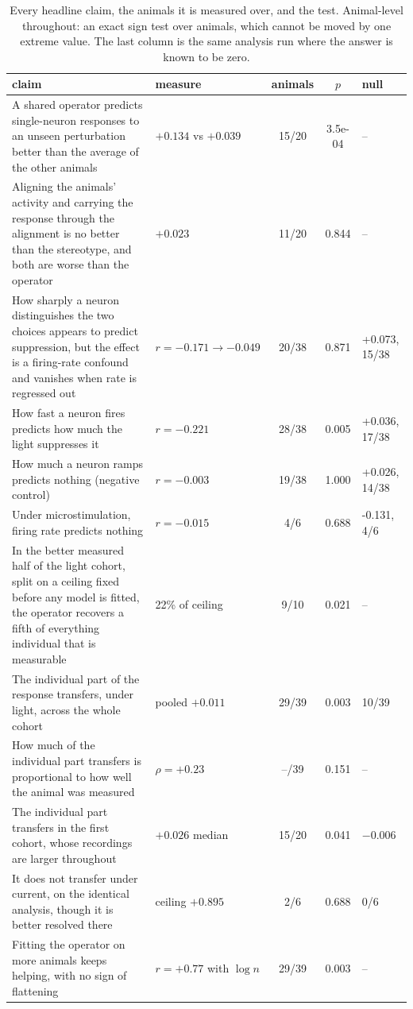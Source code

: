 \begin{table}[t]\centering\small
\caption{Every headline claim, the animals it is measured over, and the test. Animal-level throughout: an exact sign test over animals, which cannot be moved by one extreme value. The last column is the same analysis run where the answer is known to be zero.}
\label{tab:glance}
\begin{tabular}{p{5.6cm}lccl}
\toprule
claim & measure & animals & $p$ & null \\
\midrule
A shared operator predicts single-neuron responses to an unseen perturbation better than the average of the other animals & $+0.134$ vs $+0.039$ & 15/20 & 3.5e-04 & -- \\
Aligning the animals' activity and carrying the response through the alignment is no better than the stereotype, and both are worse than the operator & $+0.023$ & 11/20 & 0.844 & -- \\
How sharply a neuron distinguishes the two choices appears to predict suppression, but the effect is a firing-rate confound and vanishes when rate is regressed out & $r = -0.171 \to -0.049$ & 20/38 & 0.871 & +0.073, 15/38 \\
How fast a neuron fires predicts how much the light suppresses it & $r = -0.221$ & 28/38 & 0.005 & +0.036, 17/38 \\
How much a neuron ramps predicts nothing (negative control) & $r = -0.003$ & 19/38 & 1.000 & +0.026, 14/38 \\
Under microstimulation, firing rate predicts nothing & $r = -0.015$ & 4/6 & 0.688 & -0.131, 4/6 \\
In the better measured half of the light cohort, split on a ceiling fixed before any model is fitted, the operator recovers a fifth of everything individual that is measurable & 22\% of ceiling & 9/10 & 0.021 & -- \\
The individual part of the response transfers, under light, across the whole cohort & pooled $+0.011$ & 29/39 & 0.003 & 10/39 \\
How much of the individual part transfers is proportional to how well the animal was measured & $\rho = +0.23$ & --/39 & 0.151 & -- \\
The individual part transfers in the first cohort, whose recordings are larger throughout & $+0.026$ median & 15/20 & 0.041 & $-0.006$ \\
It does not transfer under current, on the identical analysis, though it is better resolved there & ceiling $+0.895$ & 2/6 & 0.688 & 0/6 \\
Fitting the operator on more animals keeps helping, with no sign of flattening & $r = +0.77$ with $\log n$ & 29/39 & 0.003 & -- \\
\bottomrule
\end{tabular}
\end{table}

